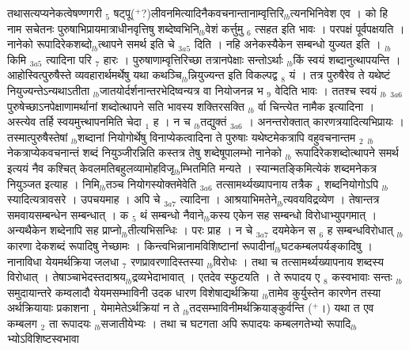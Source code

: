 \documentclass[article,12pt,a4paper]{memoir}%
\newcommand{\add}[1]{($^{+}$#1)}
\begin{document}
	  
	  \pstart \leavevmode%
	तथासत्यप्यनेकत्वेषण्णगरी {\tiny $_{5}$} षट्पू\add{?}लीवनमित्यादिनैकवचनान्तानाम्वृत्तिरि{\tiny $_{lb}$}त्यनभिनिवेश एव । को हि नाम सचेतनः पुरुषाभिप्रायमात्राधीनवृत्तिषु शब्देष्वभिनि{\tiny $_{lb}$}वेशं कर्त्तुमु {\tiny $_{6}$} त्सहत इति भावः । परपक्षं पूर्वपक्षयति । {\color{DodgerBlue3}नानेको रूपादिरेकशब्दो{\tiny $_{lb}$}त्थापने समर्थ इति चे} {\tiny $_{3a5}$} दिति । नहि अनेकस्यैकेन सम्बन्धो युज्यत इति । {\tiny $_{lb}$}किमि {\tiny $_{3a5}$} त्यादिना परि {\tiny $_{7}$} हारः । पुरुषाणाम्वृत्तिरिच्छा तत्रानपेक्षाः सन्तोऽर्थाः {\tiny $_{lb}$}किं स्वयं शब्दानुत्थापयन्ति । आहोस्वित्पुरुषैस्ते व्यवहारार्थमर्थेषु यथा कथञ्चि{\tiny $_{lb}$}न्नियुज्यन्त इति विकल्पद्व {\tiny $_{8}$} यं । तत्र पुरुषैरेव ते यथेष्टं नियुज्यन्तेऽन्यथाऽतीता {\tiny $_{lb}$}जातयोर्दर्शनान्तरभेदिष्वन्यत्र वा नियोजनन्न भ {\tiny $_{9}$} \leavevmode{} वेदिति भावः । ततश्च {\color{DodgerBlue3}स्वयं} {\tiny $_{lb}$} {\tiny $_{3a6}$} पुरुषेच्छाऽनपेक्षाणामर्थानां शब्दोत्थापने सति भावस्य शक्तिरसक्ति {\tiny $_{lb}$} र्वा चिन्त्येत {\color{DodgerBlue3}नामैक} इत्यादिना । अस्त्येव तर्हि स्वयमुत्त्थापनमिति चेदा {\tiny $_{1}$} ह । {\color{DodgerBlue3}न च {\tiny $_{lb}$}तद्युक्तं} {\tiny $_{3a6}$} । अनन्तरोक्तात् कारणत्रयादित्यभिप्रायः । तस्मात्पुरुषैस्तेषां {\tiny $_{lb}$}शब्दानां नियोगोर्थेषु विनाप्येकत्वादिना ते पुरुषाः यथेष्टमेकत्रापि वहुवचनान्तम {\tiny $_{2}$} {\tiny $_{lb}$}नेकत्राप्येकवचनान्तं शब्दं नियुञ्जीरन्निति कस्तत्र तेषु शब्देषूपालम्भो नानेको {\tiny $_{lb}$} \leavevmode{} रूपादिरेकशब्दोत्थापने समर्थ इत्ययं नैव कश्चित् केवलमतिबहुलव्यामोहविजृ{\tiny $_{lb}$}म्भितमिति मन्यते । स्यान्मतङ्किमित्येकं शब्दमनेकत्र नियुञ्जत इत्याह । {\color{DodgerBlue3}निमि{\tiny $_{lb}$}तञ्च नियोगस्योक्तमेवेति} {\tiny $_{3a6}$} तत्सामर्थ्यख्यापनाय तत्रैक {\tiny $_{4}$} शब्दनियोगोऽपि {\tiny $_{lb}$}स्यादित्यत्रावसरे । उपचयमाह । {\color{DodgerBlue3}अपि चे} {\tiny $_{3a7}$} त्यादिना । आश्रयाभिमतेने{\tiny $_{lb}$}त्यवयविद्रव्येण । तेषान्तत्र समवायसम्बन्धेन सम्बन्धात् । क {\tiny $_{5}$} थं सम्बन्धो नैवाने{\tiny $_{lb}$}कस्य एकेन सह सम्बन्धो विरोधाभ्युपगमात् । अन्यथैकेन शब्देनापि सह प्राप्नो{\tiny $_{lb}$}तीत्यभिसन्धिः । परः प्राह । {\color{DodgerBlue3}न चे} {\tiny $_{3a7}$} दयमेकेन स {\tiny $_{6}$} ह {\color{DodgerBlue3}सम्बन्धविरोधात्} {\tiny $_{lb}$}कारणा {\color{DodgerBlue3}देकशब्दं} रूपादिषु {\color{DodgerBlue3}नेच्छामः} । किन्त्वभिन्नानामविशिष्टानां रूपादीनां{\tiny $_{lb}$}घटकम्बलपर्यङ्कादिषु । नानाविधा येयमर्थक्रिया जलधा {\tiny $_{7}$} रणप्रावरणादिस्तस्या {\tiny $_{lb}$}विरोधः । तथा च तत्सामर्थ्यख्यापनाय शब्दस्य विरोधात् । तेषाञ्चाभेदस्तदाश्रय{\tiny $_{lb}$}द्रव्यभेदाभावात् । एतदेव स्फुटयति । ते रूपादय ए {\tiny $_{8}$} \leavevmode{} कस्वभावाः सन्तः {\tiny $_{lb}$}समुदायान्तरे कम्वलादौ येयमसम्भाविनी उदक धारण विशेषाद्यर्थक्रिया {\tiny $_{lb}$}तामेव कुर्युस्तेन कारणेन तस्या अर्थक्रियायाः प्रकाशना {\tiny $_{1}$} येमामेतेऽर्थक्रियां न ते {\tiny $_{lb}$}तदसम्भाविनीमर्थक्रियाङ्कुर्वन्ति \add{।} यथा त एव कम्बलग {\tiny $_{2}$} ता रूपादयः {\tiny $_{lb}$}सजातीयेभ्यः । तथा च घटगता अपि रूपादयः कम्बलगतेभ्यो रूपादि{\tiny $_{lb}$}भ्योऽविशिष्टस्वभावा 
\end{document}
